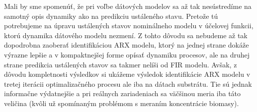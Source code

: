 Mali by sme spomenúť, že pri voľbe dátových modelov sa až tak nesústredíme na samotný opis dynamiky ako na predikciu ustáleného stavu. Pretože tú potrebujeme na úpravu ustálených stavov nominálneho modelu v účelovej funkcii, ktorú dynamika dátového modelu nezmení. Z tohto dôvodu sa nebudeme až tak dopodrobna zaoberať identifikáciou ARX modelu, ktorý na jednej strane dokáže výrazne lepšie a v kompaktnejšej forme opísať dynamiku procesov, ale na druhej strane predikcia ustálených stavov sa takmer nelíši od FIR modelu. Avšak, z dôvodu kompletnosti výsledkov si ukážeme výsledok identifikácie ARX modelu v tretej iterácii optimalizačného procesu ale iba na dátach substrátu. Tie sú jednak informačne výdatnejšie a pri reálnych zariadeniach sa väčšinou meria iba táto veličina (kvôli už spomínaným problémom s meraním koncentrácie biomasy).

